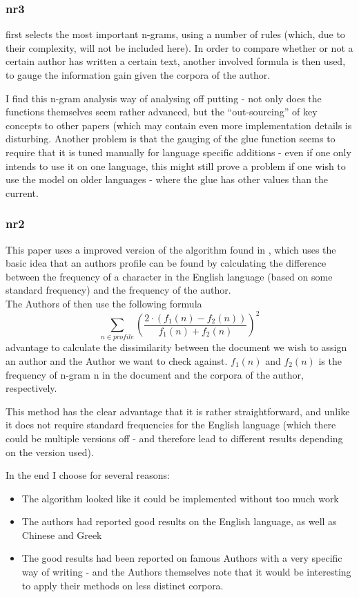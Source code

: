 \subsubsection{nr3}
\cite{nr3} first selects the most important n-grams, using a number of rules (which, due to their complexity, will not be included here). In order to compare whether or not a certain author has written a certain text, another involved formula is then used, to gauge the information gain given the corpora of the author.

I find this n-gram analysis way of analysing off putting - not only does the functions themselves seem rather advanced, but the ``out-sourcing'' of key concepts to other papers (which may contain even more implementation details is disturbing. Another problem is that the gauging of the glue function seems to require that it is tuned manually for language specific additions - even if one only intends to use it on one language, this might still prove a problem if one wish to use the model on older languages - where the glue has other values than the current. 

\subsubsection{nr2}
This paper uses a improved version of the algorithm found in \cite{Bennet}, which uses the basic idea that an authors profile can be found by calculating the difference between the frequency of a character in the English language (based on some standard frequency) and the frequency of the author.\\

The Authors of \cite{nr2} then use the following formula
$$
\sum_{n \in profile}\left(\frac{2 \cdot (f_1(n) - f_2(n))}{f_1(n) + f_2(n)}\right)^2
$$advantage
to calculate the dissimilarity between the document we wish to assign an author and the Author we want to check against. $f_1(n)$ and $f_2(n)$ is the frequency of n-gram n in the document and the corpora of the author, respectively. 

This method has the clear advantage that it is rather straightforward, and unlike \cite{Bennet} it does not require standard frequencies for the English language (which there could be multiple versions off - and therefore lead to different results depending on the version used).



In the end I choose \cite{nr4} for several reasons:
\begin{itemize}
\item The algorithm looked like it could be implemented without too much work
\item The authors had reported good results on the English language, as well as Chinese and Greek
\item The good results had been reported on famous Authors with a very specific way of writing - and the Authors themselves note that it would be interesting to apply their methods on less distinct corpora. 
\end{itemize}
